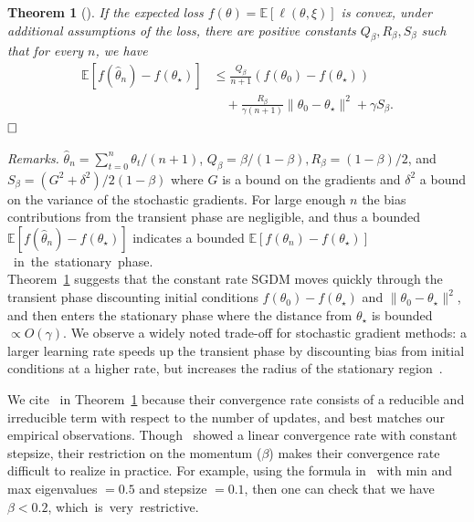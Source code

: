 \documentclass[conference]{IEEEtran}
\newcommand{\Ex}[1]{\mathbb{E}[ #1 ]}
\newtheorem{theorem}{Theorem}
\begin{document}
\begin{theorem}[\cite{yang2016unified}]
\label{thm:mom_convg_analysis}
If the expected loss $f(\theta) = \Ex{\ell(\theta,\xi)}$ is convex, under additional assumptions of the loss,  there are positive constants $Q_\beta, R_\beta, S_\beta$ such that for every $n$, we have
\begin{align*}
\mathbb{E} [ f ( \hat{\theta}_{n} ) - f ( \theta_\star ) ] &\leq \frac{Q_\beta}{n+1} ( f ( \theta_0 ) - f ( \theta_\star ) ) \\
&\quad + \frac{R_\beta}{\gamma ( n+1 )} \| \theta_0 - \theta_\star \|^2 + \gamma S_\beta. 
\end{align*} $\hfill\Box$
\end{theorem}

\emph{Remarks.}
$\hat{\theta}_n = \sum_{t=0}^n \theta_t / (n+1)$, $Q_\beta = \beta / ( 1 - \beta ), R_\beta = ( 1 - \beta ) / 2$, and $S_\beta = ( G^2 + \delta^2 ) / 2 ( 1 - \beta )$ where $G$ is a bound on the gradients and $\delta^2$ a bound on the variance of the stochastic gradients.
For large enough $n$ the bias contributions from the transient phase are negligible, and thus a bounded $\Ex{ f(\hat{\theta}_n) - f(\theta_\star) }$ indicates a bounded $\Ex{ f(\theta_n) - f(\theta_\star) }$~in~the~stationary~phase.\\

Theorem~\ref{thm:mom_convg_analysis} suggests that the constant rate SGDM moves quickly through the transient phase discounting initial conditions $f ( \theta_0 ) - f ( \theta_\star )$ and $\| \theta_0 - \theta_\star \|^2$, and then enters the stationary phase where the distance from $\theta_\star$ is bounded $\propto O ( \gamma )$. 
We observe a widely noted  trade-off  for stochastic gradient methods:  a larger learning rate speeds up the transient phase by discounting bias from initial conditions at a higher rate, but increases the radius of the stationary region~\cite{Proc:Bach_NIPS11, Article:Needell_MP16}.

We cite~\cite{yang2016unified} in Theorem~\ref{thm:mom_convg_analysis} because their convergence rate consists of a reducible and irreducible term with respect to the number of updates, and best matches our empirical observations. Though~\cite{loizou2020momentum} showed a linear convergence rate with constant stepsize, their restriction on the momentum ($\beta$) makes their convergence rate difficult to realize in practice. For example, using the formula in~\cite{loizou2020momentum} with min and max eigenvalues $=0.5$ and stepsize $=0.1$, then one can check that we have $\beta < 0.2$, which~is~very~restrictive. 
\end{document}
